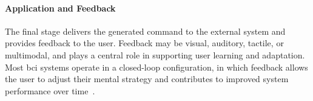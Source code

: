 \paragraph*{Application and Feedback}
The final stage delivers the generated command to the external system and provides feedback to the user. Feedback may be visual, auditory, tactile, or multimodal, and plays a central role in supporting user learning and adaptation. Most \gls{bci} systems operate in a closed-loop configuration, in which feedback allows the user to adjust their mental strategy and contributes to improved system performance over time~\cite{wang-2025}.
